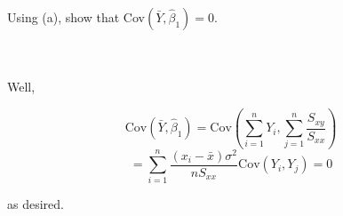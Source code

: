Using (a), show that Cov$(\bar{Y},\hat{\beta}_1)=0$.\\\\

\begin{solution}\renewcommand{\qedsymbol}{}\ \\
    Well,
    
    $$\text{Cov}(\bar{Y},\hat{\beta}_1)=\text{Cov}(\sum_{i=1}^nY_i,\sum_{j=1}^n\frac{S_{xy}}{S_{xx}})$$
    $$=\sum_{i=1}^n\frac{(x_i-\bar{x})\sigma^2}{nS_{xx}}\text{Cov}(Y_i,Y_j)=0$$
    
    as desired.%

\end{solution}